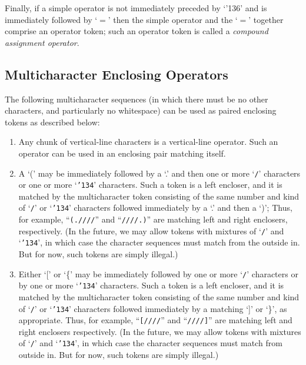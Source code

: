 Finally,
if a simple operator is not immediately preceded by `{\char'136}'
and is immediately followed by `$=$'
then the simple operator and the `$=$' together
comprise an operator token;
such an operator token is called
a \emph{compound assignment operator}.


\subsection{Multicharacter Enclosing Operators}

The following multicharacter sequences
(in which there must be no other characters, and particularly no whitespace)
can be used as paired enclosing tokens as described below:
\begin{enumerate}

\item
Any chunk of vertical-line characters
is a vertical-line operator.
Such an operator can be used in an enclosing pair matching itself.


\item
A `(' may be immediately followed
by a `.' and then one or more `\texttt{/}' characters
or one or more `\texttt{\char'134}' characters.
Such a token is a left encloser,
and it is matched by the multicharacter token
consisting of the same number and kind
of `\texttt{/}' or `\texttt{\char'134}' characters
followed immediately by a `.' and then a `)';
Thus, for example,
``\texttt{(.////}'' and ``\texttt{////.)}''
are matching left and right enclosers, respectively.
(In the future,
we may allow tokens with mixtures of `\texttt{/}' and `\texttt{\char'134}',
in which case the character sequences must match from the outside in.
But for now, such tokens are simply illegal.)

\item
Either `[' or `\{'
may be immediately followed
by one or more `\texttt{/}' characters
or by one or more `\texttt{\char'134}' characters.
Such a token is a left encloser,
and it is matched by the multicharacter token
consisting of the same number and kind
of `\texttt{/}' or `\texttt{\char'134}' characters
followed immediately by a matching `]' or `\}',
as appropriate.
Thus, for example,
``\texttt{[////}'' and ``\texttt{////]}''
are matching left and right enclosers respectively.
(In the future,
we may allow tokens with mixtures of `\texttt{/}' and `\texttt{\char'134}',
in which case the character sequences must match from outside in.
But for now, such tokens are simply illegal.)


\end{enumerate}
